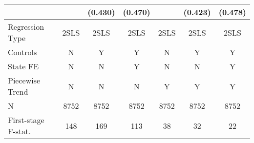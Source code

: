 {\begin{tabular}{l*{6}{c}}
                &                  &  (0.430)         &  (0.470)         &                  &  (0.423)         &  (0.478)         \\
\midrule
Regression Type &     2SLS         &     2SLS         &     2SLS         &     2SLS         &     2SLS         &     2SLS         \\
Controls        &        N         &        Y         &        Y         &        N         &        Y         &        Y         \\
State FE        &        N         &        N         &        Y         &        N         &        N         &        Y         \\
Piecewise Trend &        N         &        N         &        N         &        Y         &        Y         &        Y         \\
N               &     8752         &     8752         &     8752         &     8752         &     8752         &     8752         \\
First-stage F-stat.&      148         &      169         &      113         &       38         &       32         &       22         \\
\bottomrule
\end{tabular}
}
